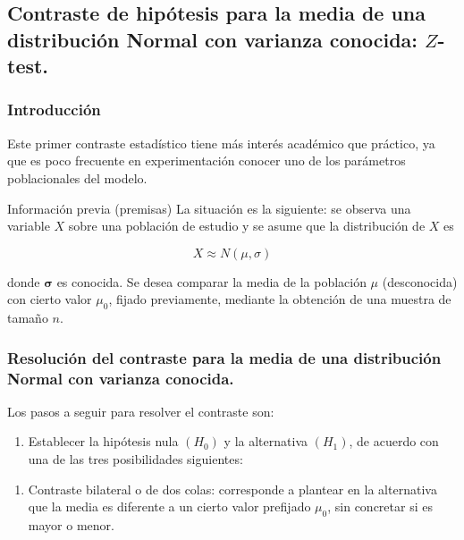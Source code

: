 \documentclass[
]{article}
\providecommand{\tightlist}{%
  \setlength{\itemsep}{0pt}\setlength{\parskip}{0pt}}
\begin{document}
\subsection{\texorpdfstring{Contraste de hipótesis para la media de una distribución Normal con varianza conocida: \(Z\)-test.}{Contraste de hipótesis para la media de una distribución Normal con varianza conocida: Z-test.}}\label{contraste-de-hipuxf3tesis-para-la-media-de-una-distribuciuxf3n-normal-con-varianza-conocida-z-test.}

\subsubsection{Introducción}\label{introducciuxf3n-3}

Este primer contraste estadístico tiene más interés académico que práctico, ya que es poco frecuente en experimentación conocer uno de los parámetros poblacionales del modelo.

Información previa (premisas)
La situación es la siguiente: se observa una variable \(X\) sobre una población de estudio y se asume que la distribución de \(X\) es

\[
X \approx N(\mu, \sigma)
\]

donde \(\boldsymbol{\sigma}\) es conocida. Se desea comparar la media de la población \(\mu\) (desconocida) con cierto valor \(\mu_{0}\), fijado previamente, mediante la obtención de una muestra de tamaño \(n\).

\subsubsection{Resolución del contraste para la media de una distribución Normal con varianza conocida.}\label{resoluciuxf3n-del-contraste-para-la-media-de-una-distribuciuxf3n-normal-con-varianza-conocida.}

Los pasos a seguir para resolver el contraste son:

\begin{enumerate}
\def\labelenumi{\arabic{enumi})}
\tightlist
\item
  Establecer la hipótesis nula \(\left(H_{0}\right)\) y la alternativa \(\left(H_{1}\right)\), de acuerdo con una de las tres posibilidades siguientes:
\end{enumerate}

\begin{enumerate}
\def\labelenumi{\alph{enumi})}
\tightlist
\item
  Contraste bilateral o de dos colas: corresponde a plantear en la alternativa que la media es diferente a un cierto valor prefijado \(\mu_{0}\), sin concretar si es mayor o menor.
\end{enumerate}
\end{document}
